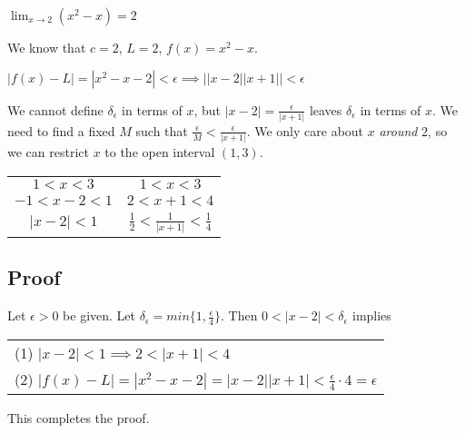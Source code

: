 \documentclass{article}
\newcommand\abs[1]{\left|#1\right|}
\begin{document}

\begin{flushleft}
\begin{center}
$\displaystyle \lim_{x \to 2} (x^2 - x) = 2$
\end{center}

We know that $c=2$, $L=2$, $f(x) = x^2 - x$. \\

\vspace{.4cm}
\begin{center}
$\abs{f(x) - L} = \abs{x^2-x-2} < \epsilon \implies \abs{\abs{x-2} \abs{x+1}} < \epsilon$ \\
\end{center}
\vspace{.4cm}

We cannot define $\delta_\epsilon$ in terms of $x$, but $\abs{x-2} = \frac{\epsilon}{\abs{x+1}}$ leaves $\delta_\epsilon$ in terms of $x$. We need to find a fixed $M$ such that $\frac{\epsilon}{M} < \frac{\epsilon}{\abs{x+1}}$. We only care about $x$ \textit{around} $2$, so we can restrict $x$ to the open interval $(1,3)$. 

\begin{center}
\begin{tabular}{c c}
$1<x<3$ & $1<x<3$ \\
$-1<x-2<1$ & $2<x+1<4$ \\
$\abs{x-2}<1$ & $\frac{1}{2}<\frac{1}{\abs{x+1}}<\frac{1}{4}$ \\
\end{tabular}
\end{center}


\subsection*{Proof}
Let $\epsilon > 0$ be given. Let $\delta_\epsilon=min\{1, \frac{\epsilon}{4}\}$. Then $0<\abs{x-2}<\delta_\epsilon$ implies
\begin{center}
\begin{tabular}{l}
(1) $\abs{x-2} < 1 \implies 2<\abs{x+1}<4$ \\
(2) $\abs{f(x) - L} =\abs{x^2-x-2} = \abs{x-2}\abs{x+1} < \frac{\epsilon}{4}\cdot4 = \epsilon$ \\
\end{tabular}
\end{center}

This completes the proof.
\end{flushleft}
\end{document}
